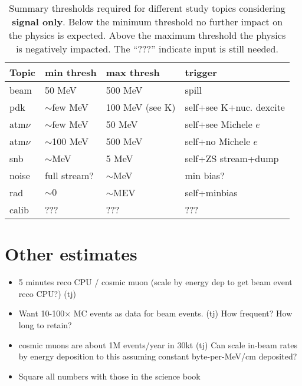 \begin{table}[htbf]
  \centering
  \begin{tabular}{|l||l|l|l|}
    \hline
    Topic & min thresh & max thresh & trigger \\
    \hline
    \hline
    beam & 50 MeV & 500 MeV & spill \\
    \hline
    pdk & $\sim$few MeV & 100 MeV (see K) & self+see K+nuc. dexcite \\
    \hline
    atm$\nu$ & $\sim$few MeV & 50 MeV &
    self+see Michele $e$ \\
    atm$\nu$ & $\sim$100 MeV & 500 MeV &
    self+no Michele $e$ \\
    \hline
    snb & $\sim$MeV & 5 MeV & self+ZS stream+dump \\
    \hline
    noise & full stream?&$\sim$MeV& min bias?\\
    \hline
    rad &$\sim 0$ & $\sim$MEV & self+minbias\\
    \hline
    calib & ??? & ??? & ??? \\
    \hline
  \end{tabular}
  \caption{Summary thresholds required for different study topics
    considering \textbf{signal only}.
  Below the minimum threshold no further impact on the physics is
  expected.
  Above the maximum threshold the physics is negatively impacted.
  The ``???'' indicate input is still needed.}
  \label{tab:physrates}
\end{table}

\section{Other estimates}

\begin{itemize}
\item 5 minutes reco CPU / cosmic muon (scale by energy dep to get
  beam event reco CPU?)
  (tj)
\item Want 10-100$\times$ MC events as data for beam events.
  (tj)
  How frequent?
  How long to retain?
\item cosmic muons are about 1M events/year in 30kt (tj)
Can scale in-beam rates by energy deposition to this assuming constant
byte-per-MeV/cm deposited?
\item Square all numbers with those in the science book  
\end{itemize}

